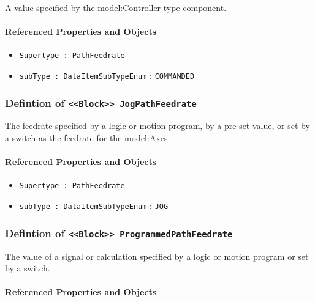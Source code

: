 \FloatBarrier

A value specified by the {model:Controller} type component.

\FloatBarrier
\paragraph{Referenced Properties and Objects}

\begin{itemize}
\item \texttt{Supertype : PathFeedrate}

\item \texttt{subType : DataItemSubTypeEnum} : \texttt{COMMANDED}

\end{itemize}
\FloatBarrier
\subsubsection{Defintion of \texttt{<<Block>> JogPathFeedrate}}
  \label{type:JogPathFeedrate}

\FloatBarrier

The feedrate specified by a logic or motion program, by a pre-set value, or set by a switch as the feedrate for the {model:Axes}. 

\FloatBarrier
\paragraph{Referenced Properties and Objects}

\begin{itemize}
\item \texttt{Supertype : PathFeedrate}

\item \texttt{subType : DataItemSubTypeEnum} : \texttt{JOG}

\end{itemize}
\FloatBarrier
\subsubsection{Defintion of \texttt{<<Block>> ProgrammedPathFeedrate}}
  \label{type:ProgrammedPathFeedrate}

\FloatBarrier

The value of a signal or calculation specified by a logic or motion program or set by a switch.

\FloatBarrier
\paragraph{Referenced Properties and Objects}

